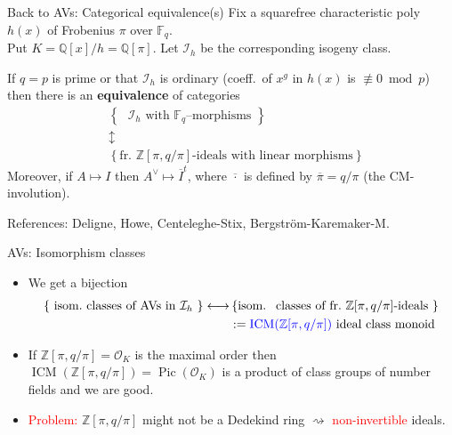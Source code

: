 \documentclass[usenames,dvipsnames]{beamer}
\def\Q{\mathbb{Q}}
\def\Z{\mathbb{Z}}
\def\F{\mathbb{F}}
\DeclareMathOperator{\ICM}{ICM}
\DeclareMathOperator{\Pic}{Pic}
\newcommand{\cO}{{\mathcal O}}
\newcommand{\set}[1]{\left\lbrace#1\right\rbrace }
\newcommand{\red}[1]{\textcolor{red}{#1}}
\newcommand{\blue}[1]{\textcolor{blue}{#1}}
\begin{document}
\begin{frame}{ Back to AVs: Categorical equivalence(s) }
    \pause
    Fix a squarefree characteristic poly $h(x)$ of Frobenius $\pi$ over $\F_q$.\\
    Put $K=\Q[x]/h=\Q[\pi]$.
    Let $\mathcal{I}_h$ be the corresponding isogeny class.
    \pause 
    \begin{theorem}
        If $q=p$ is prime or that $\mathcal{I}_h$ is ordinary (coeff.~of $x^g$ in $h(x)$ is $\not\equiv 0\bmod p$)
        \pause then there is an {\bf equivalence} of categories
        \[
        \begin{array}{cc}
        & \set{ \text{ $\mathcal{I}_h$ with $\F_q$--morphisms } }  \\
        & \updownarrow \\ 
        & \set{ \text{fr.~$\Z[\pi,q/\pi]$-ideals with linear morphisms} }
        \end{array} 
        \]  
        \pause Moreover, if $A\mapsto I$ then $A^\vee \mapsto \overline{I}^t$, where $\overline{\cdot}$ is defined by $\overline{\pi}=q/\pi$ (the CM-involution).
    \end{theorem}
    \pause References: Deligne, Howe, Centeleghe-Stix, Bergstr\"om-Karemaker-M.
\end{frame}

\begin{frame}{ AVs: Isomorphism classes }
    \begin{itemize}
        \item
        We get a bijection
        \begin{align*}
            \set{ \text{ isom.~classes of AVs in $\mathcal{I}_h$ } } \longleftrightarrow & \set{ \text{isom.~ classes of fr.~$\Z[\pi,q/\pi]$-ideals } }\\
            & :=\blue{\ICM(\Z[\pi,q/\pi])} \text{ ideal class monoid}
        \end{align*}
        \item
        If $\Z[\pi,q/\pi] = \cO_K$ is the maximal order then $\ICM(\Z[\pi,q/\pi]) = \Pic(\cO_K)$ is a product of class groups of number fields and we are good.
        \item
        \red{Problem:} $\Z[\pi,q/\pi]$ might not be a Dedekind ring $\rightsquigarrow $ \red{non-invertible} ideals.
    \end{itemize}
\end{frame}
\end{document}
